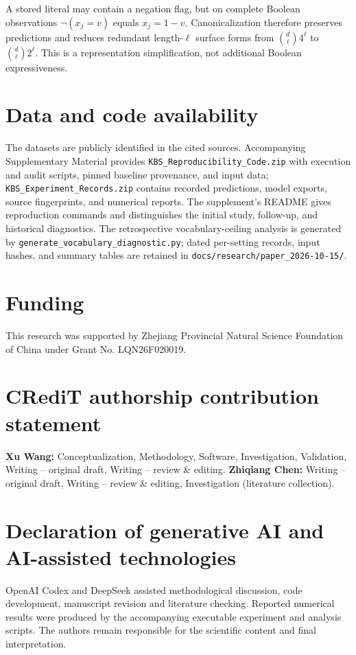 \documentclass[a4paper,fleqn,review]{cas-sc}
\newcommand{\kbsbarrier}{\FloatBarrier}
\newcommand{\kbsbarrier}{}
\begin{document}
A stored literal may contain a negation flag, but on complete Boolean observations $\neg(x_j=v)$ equals $x_j=1-v$. Canonicalization therefore preserves predictions and reduces redundant length-$\ell$ surface forms from $\binom d\ell4^\ell$ to $\binom d\ell2^\ell$. This is a representation simplification, not additional Boolean expressiveness.
\kbsbarrier

\section*{Data and code availability}
The datasets are publicly identified in the cited sources. Accompanying Supplementary Material provides \texttt{KBS\_Reproducibility\_Code.zip} with execution and audit scripts, pinned baseline provenance, and input data; \texttt{KBS\_Experiment\_Records.zip} contains recorded predictions, model exports, source fingerprints, and numerical reports. The supplement's README gives reproduction commands and distinguishes the initial study, follow-up, and historical diagnostics. The retrospective vocabulary-ceiling analysis is generated by \texttt{generate\_vocabulary\_diagnostic.py}; dated per-setting records, input hashes, and summary tables are retained in \texttt{docs/research/paper\_2026-10-15/}.

\section*{Funding}
This research was supported by Zhejiang Provincial Natural Science Foundation
of China under Grant No. LQN26F020019.

\section*{CRediT authorship contribution statement}
\textbf{Xu Wang:} Conceptualization, Methodology, Software, Investigation,
Validation, Writing -- original draft, Writing -- review \& editing.
\textbf{Zhiqiang Chen:} Writing -- original draft, Writing -- review \& editing,
Investigation (literature collection).

\section*{Declaration of generative AI and AI-assisted technologies}
OpenAI Codex and DeepSeek assisted methodological discussion, code development, manuscript revision and literature checking. Reported numerical results were produced by the accompanying executable experiment and analysis scripts. The authors remain responsible for the scientific content and final interpretation.



\end{document}
